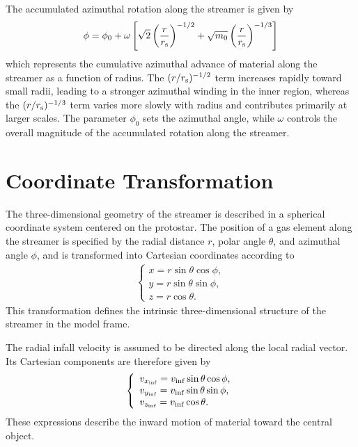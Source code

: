 The accumulated azimuthal rotation along the streamer is given by
\begin{align}
    \phi = \phi_0 + \omega
    \left[
    \sqrt{2}\left(\frac{r}{r_{\rm s}}\right)^{-1/2}
    + \sqrt{m_0}\left(\frac{r}{r_{\rm s}}\right)^{-1/3}
    \right]
\end{align}
which represents the cumulative azimuthal advance of material along the streamer as a function of radius. The $(r/r_{\rm s})^{-1/2}$ term increases rapidly toward small radii, leading to a stronger azimuthal winding in the inner region, whereas the $(r/r_{\rm s})^{-1/3}$ term varies more slowly with radius and contributes primarily at larger scales. The parameter $\phi_0$ sets the azimuthal angle, while $\omega$ controls the overall magnitude of the accumulated rotation along the streamer.

\section{Coordinate Transformation}

The three-dimensional geometry of the streamer is described in a spherical coordinate system centered on the protostar. The position of a gas element along the streamer is specified by the radial distance $r$, polar angle $\theta$, and azimuthal angle $\phi$, and is transformed into Cartesian coordinates according to
\begin{align}
    \left\{
    \begin{array}{l}
         x = r\sin\theta \cos\phi, \\
         y = r\sin\theta \sin\phi, \\
         z = r\cos\theta.
    \end{array}
    \right.
\end{align}
This transformation defines the intrinsic three-dimensional structure of the streamer in the model frame.

The radial infall velocity is assumed to be directed along the local radial vector. Its Cartesian components are therefore given by
\begin{align}
    \left\{
    \begin{array}{l}
     v_{x_{\rm inf}} = v_{\rm inf}\sin\theta \cos\phi, \\
     v_{y_{\rm inf}} = v_{\rm inf}\sin\theta \sin\phi, \\
     v_{z_{\rm inf}} = v_{\rm inf}\cos\theta.
    \end{array}
    \right.
\end{align}
These expressions describe the inward motion of material toward the central object.

